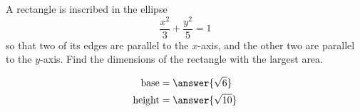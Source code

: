 \documentclass{ximera}
\author{Bart Snapp}
\begin{document}
\begin{exercise}

  A rectangle is inscribed in the ellipse
  \[
  \frac{x^2}{3}+\frac{y^2}{5}=1
  \]
  so that two of its edges are parallel to the $x$-axis, and the other two are parallel to the $y$-axis.
  Find the dimensions of the rectangle with the largest area.
  \begin{prompt}
  \begin{align*}
  \text{base} &= \answer{\sqrt{6}}\\
  \text{height} &= \answer{\sqrt{10}}
  \end{align*}
  \end{prompt}
\end{exercise}
\end{document}
